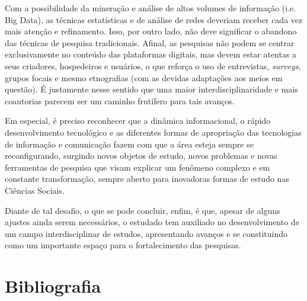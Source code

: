 Com a possibilidade da mineração e análise de altos volumes de
informação (i.e. Big Data), as técnicas estatísticas e de análise de
redes deveriam receber cada vez mais atenção e refinamento. Isso, por
outro lado, não deve significar o abandono das técnicas de pesquisa
tradicionais. Afinal, as pesquisas não podem se centrar exclusivamente
no conteúdo das plataformas digitais, mas devem estar atentas a seus
criadores, hospedeiros e usuários, o que reforça o uso de entrevistas,
\emph{surveys}, grupos focais e mesmo etnografias (com as devidas
adaptações aos meios em questão). É justamente nesse sentido que uma
maior interdisciplinaridade e mais coautorias parecem ser um caminho
frutífero para tais avanços.

Em especial, é preciso reconhecer que a dinâmica informacional, o rápido
desenvolvimento tecnológico e as diferentes formas de apropriação das
tecnologias de informação e comunicação fazem com que a área esteja
sempre se reconfigurando, surgindo novos objetos de estudo, novos
problemas e novas ferramentas de pesquisa que visam explicar um fenômeno
complexo e em constante transformação, sempre aberto para inovadoras
formas de estudo nas Ciências Sociais.

Diante de tal desafio, o que se pode concluir, enfim, é que, apesar de
alguns ajustes ainda serem necessários, o  estudado tem auxiliado no
desenvolvimento de um campo interdisciplinar de estudos, apresentando
avanços e se constituindo como um importante espaço para o
fortalecimento das pesquisas.

\section{Bibliografia}

